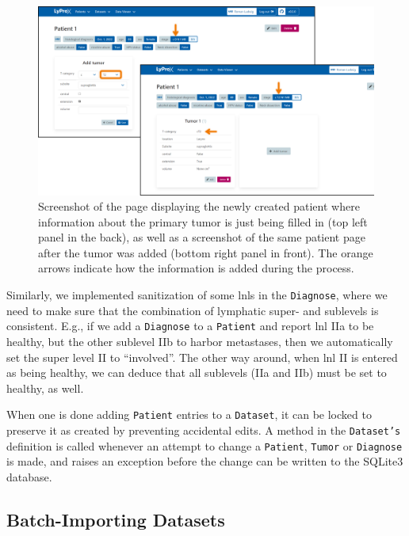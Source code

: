 \documentclass[\relativeRoot/main.tex]{subfiles}
\begin{document}
\begin{figure}
    \centering
    \includegraphics[width=1.0\textwidth]{figures/sanitize_t_stage.png}
    \caption[
        Process of adding a new tumor to a patient
    ]{
        Screenshot of the page displaying the newly created patient where information about the primary tumor is just being filled in (top left panel in the back), as well as a screenshot of the same patient page after the tumor was added (bottom right panel in front). The orange arrows indicate how the information is added during the process.
    }
    \label{fig:lyprox:sanitize_t_stage}
\end{figure}

Similarly, we implemented sanitization of some \glspl{lnl} in the \texttt{Diagnose}, where we need to make sure that the combination of lymphatic super- and sublevels is consistent. E.g., if we add a \texttt{Diagnose} to a \texttt{Patient} and report \gls{lnl} IIa to be healthy, but the other sublevel IIb to harbor metastases, then we automatically set the super level II to ``involved''. The other way around, when \gls{lnl} II is entered as being healthy, we can deduce that all sublevels (IIa and IIb) must be set to healthy, as well.

When one is done adding \texttt{Patient} entries to a \texttt{Dataset}, it can be locked to preserve it as created by preventing accidental edits. A method in the \texttt{Dataset's} definition is called whenever an attempt to change a \texttt{Patient}, \texttt{Tumor} or \texttt{Diagnose} is made, and raises an exception before the change can be written to the SQLite3 database.

\subsection*{Batch-Importing Datasets}
\label{subsec:lyprox:implementation:batch_import}
\end{document}

